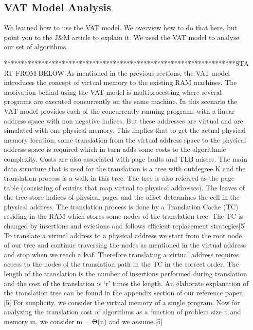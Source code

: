 \subsection{VAT Model Analysis}

  We learned how to use the VAT model.
  We overview how to do that here, but point you to the J\&M article to explain it.
  We used the VAT model to analyze our set of algorithms.
  
  ********************************************************************START FROM BELOW
  As mentioned in the previous sections, the VAT model introduces the concept of virtual memory to the existing RAM machines. The motivation behind using the VAT model is multiprocessing where several programs are executed concurrently on the same machine. In this scenario the VAT model provides each of the concurrently running programs with a linear address space with non negative indices. But these addresses are virtual and are simulated with one physical memory. This implies that to get the actual physical memory location, some translation from the virtual address space to the physical address space is required which in turn adds some costs to the algorithmic complexity. Costs are also associated with page faults and TLB misses.
The main data structure that is used for the translation is a tree with outdegree K and the translation process is a walk in this tree. The tree is also referred as the page table (consisting of entries that map virtual to physical addresses). The leaves of the tree store indices of physical pages and the offset determines the cell in the physical address.
The translation process is done by a Translation Cache (TC) residing in the RAM which stores some nodes of the translation tree. The TC is changed by insertions and evictions and follows efficient replacement strategies[5]. To translate a virtual address to a physical address we start from the root node of our tree and continue traversing the nodes as mentioned in the virtual address and stop when we reach a leaf. Therefore translating a virtual address requires access to the nodes of the translation path in the TC in the correct order. The length of the translation is the number of insertions performed during translation and the cost of the translation is ‘r’ times the length. An elaborate explanation of the translation tree can be found in the appendix section of our reference paper.[5]
For simplicity, we consider the virtual memory of a single program. Now for analyzing the translation cost of algorithms as a function of problem size n and memory m, we consider m = Θ(n) and we assume.[5]

